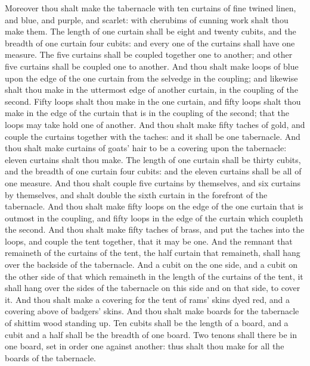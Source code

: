 \begin{biblechapter} %
 Moreover thou shalt make the tabernacle with ten curtains of fine twined linen, and blue, and purple, and scarlet: with cherubims of cunning work shalt thou make them.
\verse The length of one curtain shall be eight and twenty cubits, and the breadth of one curtain four cubits: and every one of the curtains shall have one measure.
\verse The five curtains shall be coupled together one to another; and other five curtains shall be coupled one to another.
\verse And thou shalt make loops of blue upon the edge of the one curtain from the selvedge in the coupling; and likewise shalt thou make in the uttermost edge of another curtain, in the coupling of the second.
\verse Fifty loops shalt thou make in the one curtain, and fifty loops shalt thou make in the edge of the curtain that is in the coupling of the second; that the loops may take hold one of another.
\verse And thou shalt make fifty taches of gold, and couple the curtains together with the taches: and it shall be one tabernacle.
\verse And thou shalt make curtains of goats' hair to be a covering upon the tabernacle: eleven curtains shalt thou make.
\verse The length of one curtain shall be thirty cubits, and the breadth of one curtain four cubits: and the eleven curtains shall be all of one measure.
\verse And thou shalt couple five curtains by themselves, and six curtains by themselves, and shalt double the sixth curtain in the forefront of the tabernacle.
\verse And thou shalt make fifty loops on the edge of the one curtain that is outmost in the coupling, and fifty loops in the edge of the curtain which coupleth the second.
\verse And thou shalt make fifty taches of brass, and put the taches into the loops, and couple the tent together, that it may be one.
\verse And the remnant that remaineth of the curtains of the tent, the half curtain that remaineth, shall hang over the backside of the tabernacle.
\verse And a cubit on the one side, and a cubit on the other side of that which remaineth in the length of the curtains of the tent, it shall hang over the sides of the tabernacle on this side and on that side, to cover it.
\verse And thou shalt make a covering for the tent of rams' skins dyed red, and a covering above of badgers' skins.
\verse And thou shalt make boards for the tabernacle of shittim wood standing up.
\verse Ten cubits shall be the length of a board, and a cubit and a half shall be the breadth of one board.
\verse Two tenons shall there be in one board, set in order one against another: thus shalt thou make for all the boards of the tabernacle.

\end{biblechapter}
